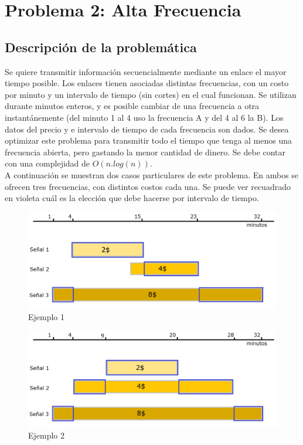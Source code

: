 \section{Problema 2: Alta Frecuencia}
\subsection{Descripci\'on de la problem\'atica}

Se quiere transmitir informaci\'on secuencialmente mediante un enlace el mayor tiempo posible. Los enlaces tienen asociadas distintas frecuencias, con un costo por minuto y un intervalo de tiempo (sin cortes) en el cual funcionan. Se utilizan durante minutos enteros, y es posible cambiar de una frecuencia a otra instant\'anemente (del minuto 1 al 4 uso la frecuencia A y del 4 al 6 la B). Los datos del precio y e intervalo de tiempo de cada frecuencia son dados. Se desea optimizar este problema para transmitir todo el tiempo que tenga al menos una frecuencia abierta, pero gastando la menor cantidad de dinero. Se debe contar con una complejidad de $O(n.log(n))$.\\

A continuaci\'on se muestran dos casos particulares de este problema. En ambos se ofrecen tres frecuencias, con distintos costos cada una. Se puede ver recuadrado en violeta cu\'al es la elecci\'on que debe hacerse por intervalo de tiempo.


 \begin{figure}[h!]
   \begin{center}
 	\includegraphics[scale=0.45]{imagenes/ej2/ejemplo1.png}
 	\caption{Ejemplo 1}
   \end{center}
 \end{figure}

 \begin{figure}[h!]
   \begin{center}
 	\includegraphics[scale=0.45]{imagenes/ej2/ejemplo2.png}
 	\caption{Ejemplo 2}
   \end{center}
 \end{figure}


